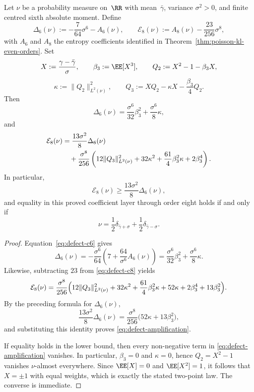 \begin{corollary}\label{thm:poisson-defect-amplification}
Let $\nu$ be a probability measure on~$\RR$ with mean~$\bar{\gamma}$,
variance $\sigma^2>0$, and finite centred sixth absolute moment.  Define
\[
\Delta_6(\nu)
:=-\frac{7}{64}\sigma^6-A_6(\nu),
\qquad
\mathcal E_8(\nu)
:=A_8(\nu)-\frac{23}{256}\sigma^8,
\]
with \(A_6\) and \(A_8\) the entropy coefficients identified in
Theorem~\ref{thm:poisson-kl-even-orders}.  Set
\[
X:=\frac{\gamma-\bar{\gamma}}{\sigma},
\qquad
\beta_3:=\EE[X^3],
\qquad
Q_2:=X^2-1-\beta_3X,
\]
\[
\kappa:=\|Q_2\|_{L^2(\nu)}^2,
\qquad
Q_3:=XQ_2-\kappa X-\frac{\beta_3}{4}Q_2.
\]
Then
\[
\Delta_6(\nu)
=\frac{\sigma^6}{32}\beta_3^2+\frac{\sigma^6}{8}\kappa,
\]
and
\begin{align}
\mathcal E_8(\nu)
&=
\frac{13\sigma^2}{8}\Delta_6(\nu)
\notag\\
&\quad
+\frac{\sigma^8}{256}\left(
12\|Q_3\|_{L^2(\nu)}^2
+32\kappa^2
+\frac{61}{4}\beta_3^2\kappa
+2\beta_3^4
\right). \label{eq:defect-amplification}
\end{align}
In particular,
\[
\mathcal E_8(\nu)\ge
\frac{13\sigma^2}{8}\Delta_6(\nu),
\]
and equality in this proved coefficient layer through order eight holds if and only if
\[
\nu=\frac12\delta_{\bar{\gamma}+\sigma}
+\frac12\delta_{\bar{\gamma}-\sigma}.
\]
\end{corollary}

\begin{proof}
Equation~\eqref{eq:defect-c6} gives
\[
\Delta_6(\nu)
=-\frac{\sigma^6}{64}
\left(7+\frac{64}{\sigma^6}A_6(\nu)\right)
=\frac{\sigma^6}{32}\beta_3^2+\frac{\sigma^6}{8}\kappa.
\]
Likewise, subtracting $23$ from \eqref{eq:defect-c8} yields
\[
\mathcal E_8(\nu)
=\frac{\sigma^8}{256}\Bigl(
12\|Q_3\|_{L^2(\nu)}^2
+32\kappa^2
+\frac{61}{4}\beta_3^2\kappa
+52\kappa
+2\beta_3^4
+13\beta_3^2
\Bigr).
\]
By the preceding formula for \(\Delta_6(\nu)\),
\[
\frac{13\sigma^2}{8}\Delta_6(\nu)
=\frac{\sigma^8}{256}\bigl(52\kappa+13\beta_3^2\bigr),
\]
and substituting this identity proves \eqref{eq:defect-amplification}.

If equality holds in the lower bound, then every non-negative term in
\eqref{eq:defect-amplification} vanishes.  In particular,
$\beta_3=0$ and $\kappa=0$, hence $Q_2=X^2-1$ vanishes
$\nu$-almost everywhere.  Since $\EE[X]=0$ and $\EE[X^2]=1$, it follows
that $X=\pm 1$ with equal weights, which is exactly the stated
two-point law.  The converse is immediate.
\end{proof}

